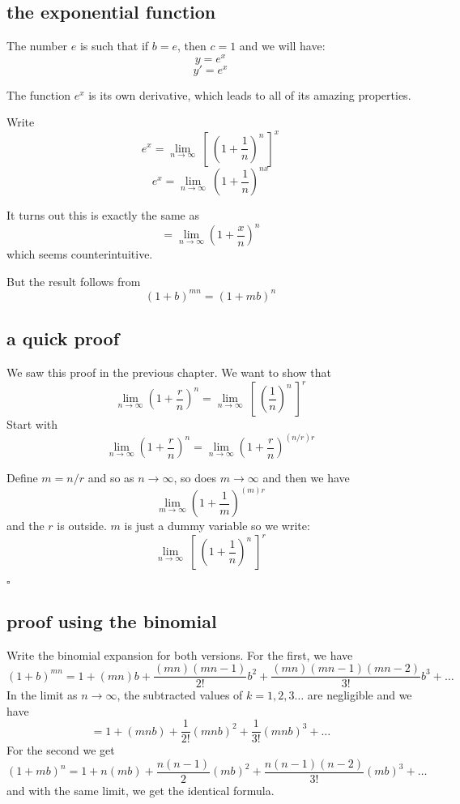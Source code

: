 \documentclass[11pt, oneside]{article}
\begin{document}
\subsection*{the exponential function}

The number $e$ is such that if $b=e$, then $c=1$ and we will have:
\[ y = e^x \]
\[ y' = e^x \]

The function $e^x$ is its own derivative, which leads to all of its amazing properties.

Write
\[ e^x = \lim_{n \rightarrow \infty} \ [ \ (1 + \frac{1}{n})^{n} \ ]^x \]
\[ e^x = \lim_{n \rightarrow \infty} \ (1 + \frac{1}{n})^{nx} \]

It turns out this is exactly the same as
\[ = \lim_{n \to \infty} (1 + \frac{x}{n})^{n} \]
which seems counterintuitive.  

But the result follows from
\[ (1+b)^{mn} = (1+mb)^n \]

\subsection*{a quick proof}

We saw this proof in the previous chapter.  We want to show that
\[ \lim_{n \rightarrow \infty} (1 + \frac{r}{n})^{n}  = \lim_{n \rightarrow \infty} \ [ \ (\frac{1}{n})^{n} \ ] ^r \]
Start with
\[ \lim_{n \rightarrow \infty} (1 + \frac{r}{n})^{n}  = \lim_{n \rightarrow \infty} (1 + \frac{r}{n})^{(n/r)r} \]

Define $m = n/r$ and so as $n \rightarrow \infty$, so does $m \rightarrow \infty$ and then we have
\[ \lim_{m \rightarrow \infty} (1 + \frac{1}{m})^{(m)r} \]
and the $r$ is outside.  $m$ is just a dummy variable so we write:
\[ \lim_{n \rightarrow \infty} \ [ \  (1 + \frac{1}{n})^{n} \ ]^r \]

$\square$

\subsection*{proof using the binomial}

Write the binomial expansion for both versions.  For the first, we have
\[ (1+b)^{mn} = 1 + (mn)b + \frac{(mn)(mn-1)}{2!} b^2 + \frac{(mn)(mn-1)(mn-2)}{3!} b^3 + \dots \]
In the limit as $n \rightarrow \infty$, the subtracted values of $k = 1,2,3 \dots$ are negligible and we have
\[ = 1 + (mnb) + \frac{1}{2!} (mnb)^2 + \frac{1}{3!} (mnb)^3 + \dots \]
For the second we get
\[ (1+mb)^n = 1 + n(mb) + \frac{n(n-1)}{2} (mb)^2 + \frac{n(n-1)(n-2)}{3!} (mb)^3 + \dots \]
and with the same limit, we get the identical formula.
\end{document}

